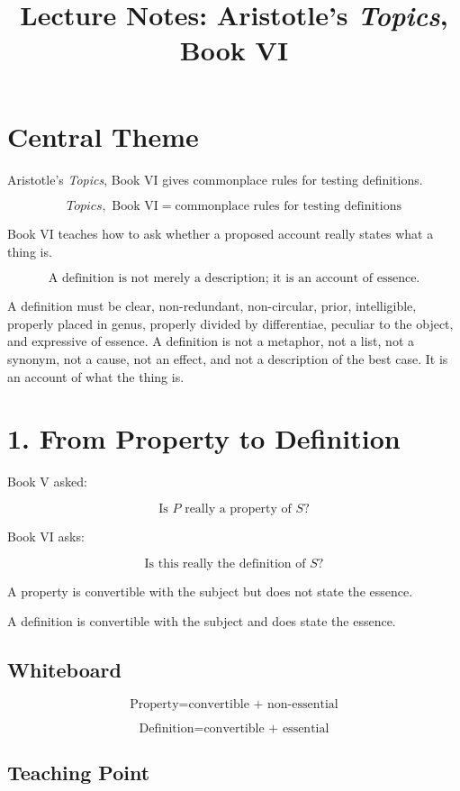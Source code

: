 \documentclass[12pt]{article}
\title{Lecture Notes: Aristotle's \textit{Topics}, Book VI}
\author{}
\date{}
\begin{document}
\maketitle

\section*{Central Theme}

Aristotle's \textit{Topics}, Book VI gives commonplace rules for testing
definitions.

\[
\boxed{
\textit{Topics}, \text{ Book VI}
=
\text{commonplace rules for testing definitions}
}
\]

Book VI teaches how to ask whether a proposed account really states what a
thing is.

\[
\boxed{
\text{A definition is not merely a description; it is an account of essence.}
}
\]

A definition must be clear, non-redundant, non-circular, prior, intelligible,
properly placed in genus, properly divided by differentiae, peculiar to the
object, and expressive of essence. A definition is not a metaphor, not a list,
not a synonym, not a cause, not an effect, and not a description of the best
case. It is an account of what the thing is.

\section*{1. From Property to Definition}

Book V asked:

\[
\text{Is } P \text{ really a property of } S?
\]

Book VI asks:

\[
\text{Is this really the definition of } S?
\]

A property is convertible with the subject but does not state the essence.

A definition is convertible with the subject and does state the essence.

\subsection*{Whiteboard}

\[
\text{Property} = \text{convertible + non-essential}
\]

\[
\text{Definition} = \text{convertible + essential}
\]

\subsection*{Teaching Point}
\end{document}
